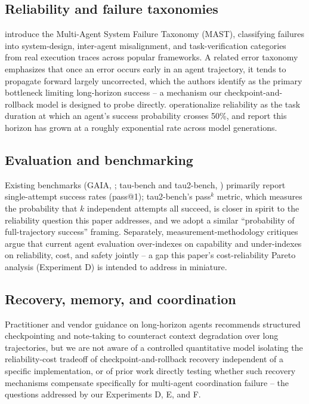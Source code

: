 \documentclass[11pt]{article}
\begin{document}
\subsection{Reliability and failure taxonomies}
\citet{cemri2025why} introduce the Multi-Agent System Failure Taxonomy (MAST), classifying failures into system-design, inter-agent misalignment, and task-verification categories from real execution traces across popular frameworks. A related error taxonomy emphasizes that once an error occurs early in an agent trajectory, it tends to propagate forward largely uncorrected, which the authors identify as the primary bottleneck limiting long-horizon success -- a mechanism our checkpoint-and-rollback model is designed to probe directly. \citet{kwa2025measuring} operationalize reliability as the task duration at which an agent's success probability crosses 50\%, and report this horizon has grown at a roughly exponential rate across model generations.

\subsection{Evaluation and benchmarking}
Existing benchmarks (GAIA, \citealp{mialon2023gaia}; tau-bench and tau2-bench, \citealp{yao2024taubench,barres2025tau2bench}) primarily report single-attempt success rates (pass@1); tau2-bench's pass$^k$ metric, which measures the probability that $k$ independent attempts all succeed, is closer in spirit to the reliability question this paper addresses, and we adopt a similar ``probability of full-trajectory success'' framing. Separately, measurement-methodology critiques argue that current agent evaluation over-indexes on capability and under-indexes on reliability, cost, and safety jointly -- a gap this paper's cost-reliability Pareto analysis (Experiment D) is intended to address in miniature.

\subsection{Recovery, memory, and coordination}
Practitioner and vendor guidance on long-horizon agents recommends structured checkpointing and note-taking to counteract context degradation over long trajectories, but we are not aware of a controlled quantitative model isolating the reliability-cost tradeoff of checkpoint-and-rollback recovery independent of a specific implementation, or of prior work directly testing whether such recovery mechanisms compensate specifically for multi-agent coordination failure -- the questions addressed by our Experiments D, E, and F.
\end{document}
